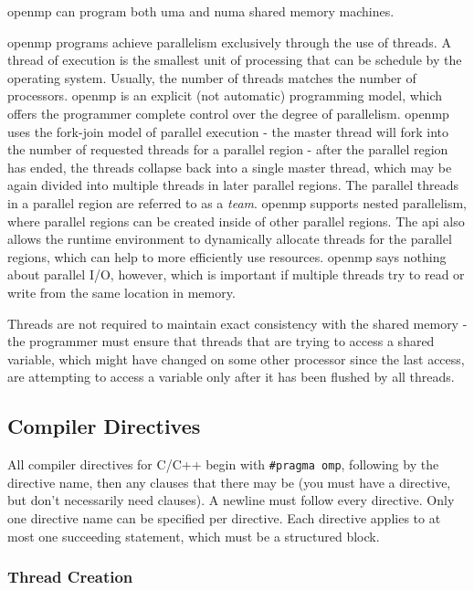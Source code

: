 \documentclass[10pt]{article}
\begin{document}
\begin{flushleft}
\gls{openmp} can program both \gls{uma} and \gls{numa} shared memory machines. 

\gls{openmp} programs achieve parallelism exclusively through the use of threads. A thread of execution is the smallest unit of processing that can be schedule by the operating system. Usually, the number of threads matches the number of processors. \gls{openmp} is an explicit (not automatic) programming model, which offers the programmer complete control over the degree of parallelism. \gls{openmp} uses the fork-join model of parallel execution - the master thread will fork into the number of requested threads for a parallel region - after the parallel region has ended, the threads collapse back into a single master thread, which may be again divided into multiple threads in later parallel regions. The parallel threads in a parallel region are referred to as a \textit{team}. \gls{openmp} supports nested parallelism, where parallel regions can be created inside of other parallel regions. The \gls{api} also allows the runtime environment to dynamically allocate threads for the parallel regions, which can help to more efficiently use resources. \gls{openmp} says nothing about parallel I/O, however, which is important if multiple threads try to read or write from the same location in memory.

Threads are not required to maintain exact consistency with the shared memory - the programmer must ensure that threads that are trying to access a shared variable, which might have changed on some other processor since the last access, are attempting to access a variable only after it has been flushed by all threads.

\subsection{Compiler Directives}

All compiler directives for C/C++ begin with {\tt \#pragma omp}, following by the directive name, then any clauses that there may be (you must have a directive, but don't necessarily need clauses). A newline must follow every directive. Only one directive name can be specified per directive. Each directive applies to at most one succeeding statement, which must be a structured block. 

\subsubsection{Thread Creation}


\end{flushleft}
\end{document}
